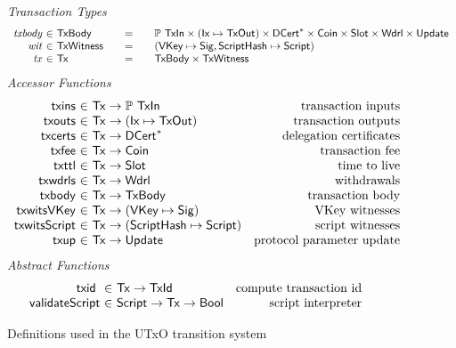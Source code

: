 \begin{figure*}[htb]
  \emph{Transaction Types}
  \begin{equation*}
    \begin{array}{r@{~\in~}l@{\qquad=\qquad}l}
      \var{txbody}
      & \TxBody
      & \powerset{\TxIn} \times (\Ix \mapsto \TxOut) \times \seqof{\DCert}
        \times \Coin \times \Slot \times \Wdrl \times \Update
      \\
      \var{wit} & \TxWitness & (\VKey \mapsto \Sig, \HashScr \mapsto \Script)
      \\
      \var{tx}
      & \Tx
      & \TxBody \times \TxWitness
    \end{array}
  \end{equation*}
  \emph{Accessor Functions}
  \begin{equation*}
    \begin{array}{r@{~\in~}lr}
      \fun{txins} & \Tx \to \powerset{\TxIn} & \text{transaction inputs} \\
      \fun{txouts} & \Tx \to (\Ix \mapsto \TxOut) & \text{transaction outputs} \\
      \fun{txcerts} & \Tx \to \seqof{\DCert} & \text{delegation certificates} \\
      \fun{txfee} & \Tx \to \Coin & \text{transaction fee} \\
      \fun{txttl} & \Tx \to \Slot & \text{time to live} \\
      \fun{txwdrls} & \Tx \to \Wdrl & \text{withdrawals} \\
      \fun{txbody} & \Tx \to \TxBody & \text{transaction body}\\
      \fun{txwitsVKey} & \Tx \to (\VKey \mapsto \Sig) & \text{VKey witnesses} \\
      \fun{txwitsScript} & \Tx \to (\HashScr \mapsto \Script) & \text{script witnesses}\\
      \fun{txup} & \Tx \to \Update & \text{protocol parameter update}
    \end{array}
  \end{equation*}
  \emph{Abstract Functions}
  \begin{equation*}
    \begin{array}{r@{~\in~}lr}
      \txid{} & \Tx \to \TxId & \text{compute transaction id}\\
      \fun{validateScript} & \Script \to \Tx \to \Bool & \text{script interpreter}
    \end{array}
  \end{equation*}
  \caption{Definitions used in the UTxO transition system}
  \label{fig:defs:utxo-shelley}
\end{figure*}

